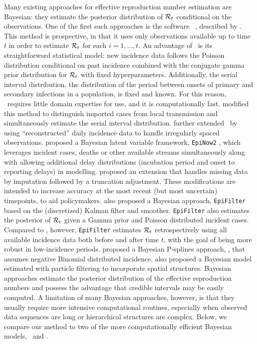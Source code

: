 Many existing approaches for effective reproduction number estimation are
Bayesian: they estimate the posterior distribution of $\mathcal{R}_t$ conditional on
the observations. One of the first such approaches is the software \EpiEstim\
\citep{cori2020package}, described by \citet{cori2013new}. This method is
prospective, in that it uses only observations available up to time $t$ in order to
estimate $\mathcal{R}_t$ for each $i = 1,\ldots, t$. An advantage of \EpiEstim\ is its
straightforward statistical model: new incidence data follows the Poisson
distribution conditional on past incidence combined with the conjugate gamma prior
distribution for $\mathcal{R}_t$ with fixed hyperparameters. Additionally, the serial
interval distribution, the distribution of the period between onsets of primary and secondary 
infections in a population, is fixed and known. For this reason, \EpiEstim\ requires
little domain expertise for use, and it is computationally fast.
\citet{thompson2019improved} modified this method to distinguish imported cases from local transmission and
simultaneously estimate the serial interval distribution.
\citet{nash2023estimating} further extended \EpiEstim\ by using
``reconstructed'' daily incidence data to handle irregularly spaced observations.
% 
\cite{abbott2020estimating} proposed a Bayesian latent variable framework,
\texttt{EpiNow2} \citep{EpiNow2}, which leverages incident cases, deaths or
other available streams simultaneously along with allowing additional delay
distributions (incubation period and onset to reporting delays) in modelling.  
\citet{lison2023generative} proposed an extension that handles missing data by
imputation followed by a truncation adjustment. These modifications are intended
to increase accuracy at the most recent (but most uncertain) timepoints, to aid policymakers.
%
\citet{parag2021improved} also proposed a Bayesian approach, \texttt{EpiFilter}
based on the (discretized) Kalman filter and smoother. \texttt{EpiFilter} also
estimates the posterior of $\mathcal{R}_t$ given a Gamma prior and Poisson distributed
incident cases. Compared to \EpiEstim, however, \texttt{EpiFilter} estimates
$\mathcal{R}_t$ retrospectively using all available incidence data both before and
after time $t$, with the goal of being more robust in low-incidence periods.  
\citet{gressani2022epilps} proposed a Bayesian P-splines approach, \EpiLPS, that
assumes negative Binomial distributed incidence. \citet{trevisin2023spatially}
also proposed a Bayesian model estimated with particle filtering to incorporate
spatial structures.
%
Bayesian approaches estimate the posterior distribution of the effective
reproduction numbers and possess the advantage that credible intervals may be
easily computed. A limitation of many Bayesian approaches, however, is that they
usually require more intensive computational routines, especially when observed
data sequences are long or hierarchical structures are complex.  Below, we
compare our method to two of the more computationally efficient Bayesian models,
\EpiEstim\ and \EpiLPS. 

